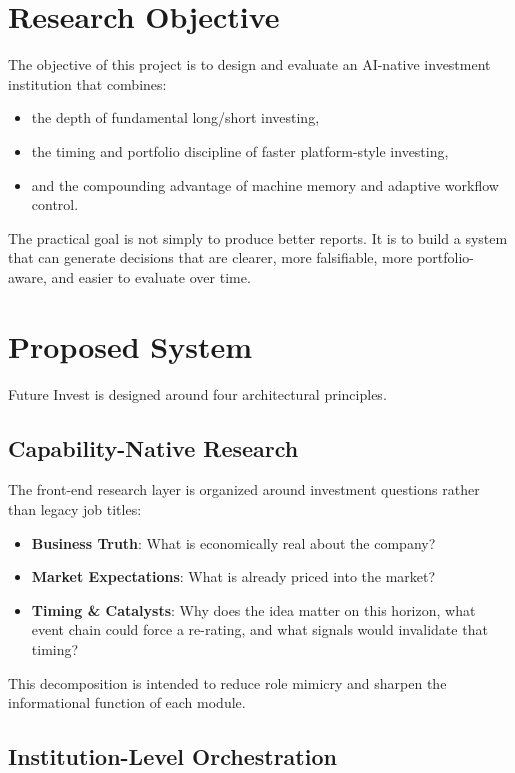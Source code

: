 \documentclass[11pt]{article}
\begin{document}
\section{Research Objective}

The objective of this project is to design and evaluate an AI-native investment institution that combines:

\begin{itemize}
\item the depth of fundamental long/short investing,
\item the timing and portfolio discipline of faster platform-style investing,
\item and the compounding advantage of machine memory and adaptive workflow control.
\end{itemize}

The practical goal is not simply to produce better reports. It is to build a system that can generate decisions that are clearer, more falsifiable, more portfolio-aware, and easier to evaluate over time.

\section{Proposed System}

Future Invest is designed around four architectural principles.

\subsection{Capability-Native Research}

The front-end research layer is organized around investment questions rather than legacy job titles:

\begin{itemize}
\item \textbf{Business Truth}: What is economically real about the company?
\item \textbf{Market Expectations}: What is already priced into the market?
\item \textbf{Timing \& Catalysts}: Why does the idea matter on this horizon, what event chain could force a re-rating, and what signals would invalidate that timing?
\end{itemize}

This decomposition is intended to reduce role mimicry and sharpen the informational function of each module.

\subsection{Institution-Level Orchestration}
\end{document}
